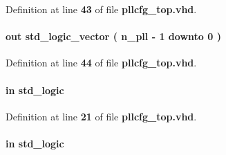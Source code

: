 Definition at line {\bf 43} of file {\bf pllcfg\+\_\+top.\+vhd}.

\paragraph[{pllrst\+\_\+start}]{ {\bfseries \textcolor{keywordflow}{out}\textcolor{vhdlchar}{ }} {\bfseries \textcolor{comment}{std\+\_\+logic\+\_\+vector}\textcolor{vhdlchar}{ }\textcolor{vhdlchar}{(}\textcolor{vhdlchar}{ }\textcolor{vhdlchar}{ }\textcolor{vhdlchar}{ }\textcolor{vhdlchar}{ }{\bfseries {\bf n\+\_\+pll}} \textcolor{vhdlchar}{-\/}\textcolor{vhdlchar}{ } \textcolor{vhdldigit}{1} \textcolor{vhdlchar}{ }\textcolor{keywordflow}{downto}\textcolor{vhdlchar}{ }\textcolor{vhdlchar}{ } \textcolor{vhdldigit}{0} \textcolor{vhdlchar}{ }\textcolor{vhdlchar}{)}\textcolor{vhdlchar}{ }} \hspace{0.3cm}{\ttfamily [Port]}}\label{classpllcfg__top_a0f33a236771ced7c79179b1dd5adefa2}


Definition at line {\bf 44} of file {\bf pllcfg\+\_\+top.\+vhd}.

\paragraph[{sclkA}]{ {\bfseries \textcolor{keywordflow}{in}\textcolor{vhdlchar}{ }} {\bfseries \textcolor{comment}{std\+\_\+logic}\textcolor{vhdlchar}{ }} \hspace{0.3cm}{\ttfamily [Port]}}\label{classpllcfg__top_a860f39249e7b7ffae5b85dcfacf1f055}


Definition at line {\bf 21} of file {\bf pllcfg\+\_\+top.\+vhd}.

\paragraph[{sclkB}]{ {\bfseries \textcolor{keywordflow}{in}\textcolor{vhdlchar}{ }} {\bfseries \textcolor{comment}{std\+\_\+logic}\textcolor{vhdlchar}{ }} \hspace{0.3cm}{\ttfamily [Port]}}\label{classpllcfg__top_a3b671eb6d56f86d814015e6d4122ea7d}


